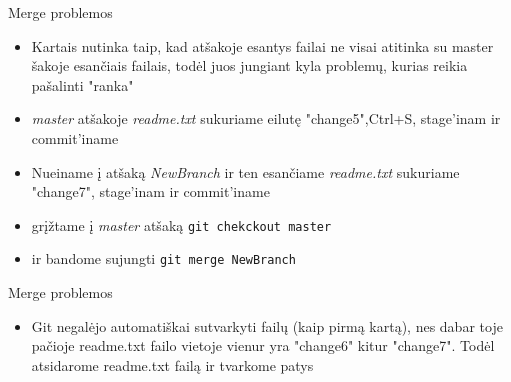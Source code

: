 \documentclass[11pt,xcolor=table]{beamer}
\begin{document}
\begin{frame}[fragile]{Merge problemos}
\begin{itemize}
\item Kartais nutinka taip, kad atšakoje esantys failai ne visai atitinka su master šakoje esančiais failais, todėl juos jungiant kyla problemų, kurias reikia pašalinti "ranka"
\item \textit{master} atšakoje \textit{readme.txt} sukuriame eilutę "change5",Ctrl+S, stage'inam ir commit'iname 
\item Nueiname į atšaką \textit{NewBranch} ir ten esančiame \textit{readme.txt} sukuriame "change7", stage'inam ir commit'iname 
\item grįžtame į \textit{master} atšaką \colorbox{listinggray}{\lstinline|git chekckout master|}
\item ir bandome sujungti \colorbox{listinggray}{\lstinline|git merge NewBranch|}
\end{itemize}
\end{frame}


\begin{frame}[fragile]{Merge problemos}
\begin{itemize}
\begin{lstlisting}
USER@PC MINGW64 ~/Desktop/S175/test (master)
$ git merge NewBranch
Auto-merging readme.txt
CONFLICT (content): Merge conflict in readme.txt
Automatic merge failed; fix conflicts and then commit the result.
\end{lstlisting}

\item Git negalėjo automatiškai sutvarkyti failų (kaip pirmą kartą), nes dabar toje pačioje readme.txt failo vietoje vienur yra "change6" kitur "change7". Todėl atsidarome readme.txt failą ir tvarkome patys
\end{itemize}
\end{frame}
\end{document}
